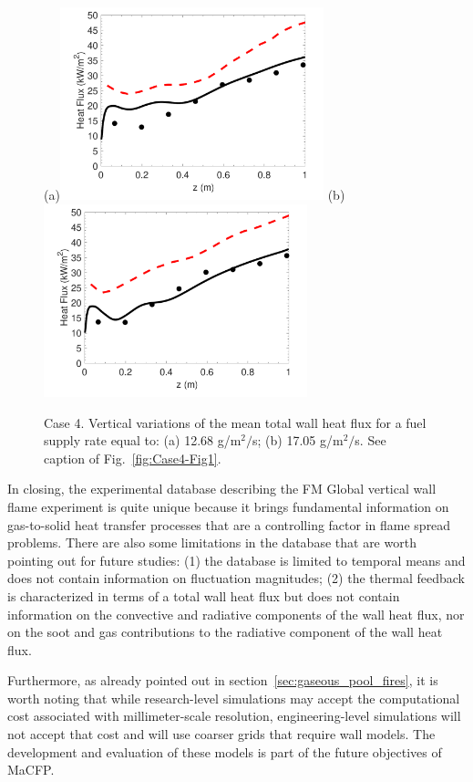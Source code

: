 \begin{figure}
\centering
(a)\includegraphics[height=2.2in]{Figures/Case4-Fig2a.pdf}
(b)\includegraphics[height=2.2in]{Figures/Case4-Fig2b.pdf}
\caption{Case 4. Vertical variations of the mean total wall heat flux for a fuel supply rate equal to: (a) 12.68 g/m$^2/$s; (b) 17.05 g/m$^2/$s. See caption of Fig.~\ref{fig:Case4-Fig1}.}
\label{fig:Case4-Fig2}
\end{figure}

In closing, the experimental database describing the FM Global vertical wall flame experiment is quite unique because it brings fundamental information on gas-to-solid heat transfer processes that are a controlling factor in flame spread problems. There are also some limitations in the database that are worth pointing out for future studies: (1) the database is limited to temporal means and does not contain information on fluctuation magnitudes; (2) the thermal feedback is characterized in terms of a total wall heat flux but does not contain information on the convective and radiative components of the wall heat flux, nor on the soot and gas contributions to the radiative component of the wall heat flux.

Furthermore, as already pointed out in section~\ref{sec:gaseous_pool_fires}, it is worth noting that while research-level simulations may accept the computational cost associated with millimeter-scale resolution, engineering-level simulations will not accept that cost and will use coarser grids that require wall models. The development and evaluation of these models is part of the future objectives of MaCFP.


